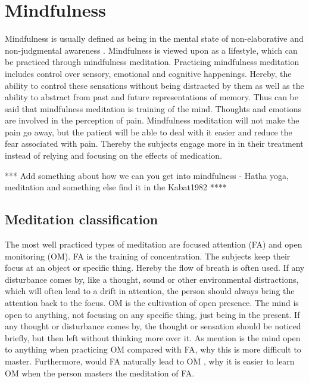 \section{Mindfulness}
Mindfulness is usually defined as being in the mental state of non-elaborative and non-judgmental awareness \cite{Zeidan2012,Zeidan2016,Tang2017}. Mindfulness is viewed upon as a lifestyle, which can be practiced through mindfulness meditation. Practicing mindfulness meditation includes control over sensory, emotional and cognitive happenings. Hereby, the ability to control these sensations without being distracted by them as well as the ability to abstract from past and future representations of memory. Thus can be said that mindfulness meditation is training of the mind. \cite{Tang2017}
Thoughts and emotions are involved in the perception of pain.
Mindfulness meditation will not make the pain go away, but the patient will be able to deal with it easier and reduce the fear associated with pain. Thereby the subjects engage more in in their treatment instead of relying and focusing on the effects of medication. \cite{Jacob2016}

*** Add something about how we can you get into mindfulness - Hatha yoga, meditation and something else find it in the Kabat1982 ****

\subsection{Meditation classification}
The most well practiced types of meditation are focused attention (FA) and open monitoring (OM).\cite{Zeidan2016} FA is the training of concentration. The subjects keep their focus at an object or specific thing. Hereby the flow of breath is often used.  If any disturbance comes by, like a thought, sound or other environmental distractions, which will often lead to a drift in attention, the person should always bring the attention back to the focus. \cite{Zeidan2016} OM is the cultivation of open presence. The mind is open to anything, not focusing on any specific thing, just being in the present. If any thought or disturbance comes by, the thought or sensation should be noticed briefly, but then left without thinking more over it. As mention is the mind open to anything when practicing OM compared with FA, why this is more difficult to master. Furthermore, would FA naturally lead to OM \cite{Perlman2016}, why it is easier to learn OM when the person masters the meditation of FA.\cite{Zeidan2016}



